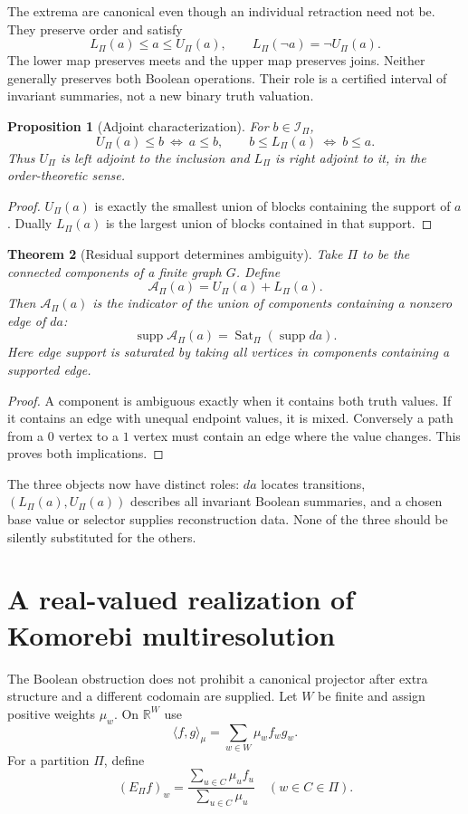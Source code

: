 \documentclass[11pt,letterpaper]{article}
\newtheorem{theorem}{Theorem}[section]
\newtheorem{proposition}[theorem]{Proposition}
\theoremstyle{definition}
\newcommand{\Inv}{\mathcal I}
\newcommand{\supp}{\operatorname{supp}}
\newcommand{\Sat}{\operatorname{Sat}}
\begin{document}
The extrema are canonical even though an individual retraction need not be. They preserve order and satisfy
\[
L_\Pi(a)\leq a\leq U_\Pi(a),\qquad
L_\Pi(\neg a)=\neg U_\Pi(a).
\]
The lower map preserves meets and the upper map preserves joins. Neither generally preserves both Boolean operations. Their role is a certified interval of invariant summaries, not a new binary truth valuation.

\begin{proposition}[Adjoint characterization]\label{prop:adjoints}
For $b\in\Inv_\Pi$,
\[
U_\Pi(a)\leq b\ \Longleftrightarrow\ a\leq b,\qquad
b\leq L_\Pi(a)\ \Longleftrightarrow\ b\leq a.
\]
Thus $U_\Pi$ is left adjoint to the inclusion and $L_\Pi$ is right adjoint to it, in the order-theoretic sense.
\end{proposition}
\begin{proof}
$U_\Pi(a)$ is exactly the smallest union of blocks containing the support of $a$. Dually $L_\Pi(a)$ is the largest union of blocks contained in that support.
\end{proof}

\begin{theorem}[Residual support determines ambiguity]\label{thm:ambiguity}
Take $\Pi$ to be the connected components of a finite graph $G$. Define
\[
\mathcal A_\Pi(a)=U_\Pi(a)+L_\Pi(a).
\]
Then $\mathcal A_\Pi(a)$ is the indicator of the union of components containing a nonzero edge of $da$:
\[
\supp\mathcal A_\Pi(a)=\Sat_\Pi(\supp da).
\]
Here edge support is saturated by taking all vertices in components containing a supported edge.
\end{theorem}
\begin{proof}
A component is ambiguous exactly when it contains both truth values. If it contains an edge with unequal endpoint values, it is mixed. Conversely a path from a $0$ vertex to a $1$ vertex must contain an edge where the value changes. This proves both implications.
\end{proof}

The three objects now have distinct roles: $da$ locates transitions, $(L_\Pi(a),U_\Pi(a))$ describes all invariant Boolean summaries, and a chosen base value or selector supplies reconstruction data. None of the three should be silently substituted for the others.

\section{A real-valued realization of Komorebi multiresolution}\label{sec:real}
The Boolean obstruction does not prohibit a canonical projector after extra structure and a different codomain are supplied. Let $W$ be finite and assign positive weights $\mu_w$. On $\mathbb R^W$ use
\[
\langle f,g\rangle_\mu=\sum_{w\in W}\mu_w f_wg_w.
\]
For a partition $\Pi$, define
\[
(E_\Pi f)_w=
\frac{\sum_{u\in C}\mu_u f_u}{\sum_{u\in C}\mu_u}
\quad(w\in C\in\Pi).
\]
\end{document}
